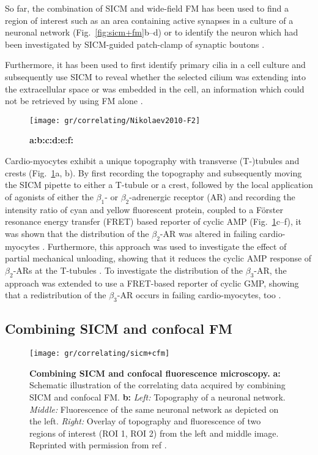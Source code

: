 So far, the combination of SICM and wide-field FM has been used to find a
region of interest such as an area containing active synapses in a culture of
a neuronal network \cite{Scheenen2015} (Fig.~\ref{fig:sicm+fm}b--d) or to
identify the neuron which had been investigated by SICM-guided patch-clamp of
synaptic boutons \cite{Novak2013}.

Furthermore, it has been used to first identify primary cilia in a cell
culture and subsequently use SICM to reveal whether the selected cilium was
extending into the extracellular space or was embedded in the cell, an
information which could not be retrieved by using FM alone \cite{Zhou2018}.


\begin{figure}
  \texttt{[image: gr/correlating/Nikolaev2010-F2]}
  \caption{
    \textbf{a:}\textbf{b:}\textbf{c:}\textbf{d:}\textbf{e:}\textbf{f:}
  }
  \label{fig:nikolaev2010}
\end{figure}

Cardio-myocytes exhibit a unique topography with transverse (T-)tubules and
crests (Fig.~\ref{fig:nikolaev2010}a, b). By first recording the topography
and subsequently moving the SICM pipette to either a T-tubule or a crest,
followed by the local application of agonists of either the $\beta_1$- or
$\beta_2$-adrenergic receptor (AR) and recording the intensity ratio of cyan
and yellow fluorescent protein, coupled to a Förster resonance energy transfer
(FRET) based reporter of cyclic AMP (Fig.~\ref{fig:nikolaev2010}c--f), it was
shown that the distribution of the $\beta_2$-AR was altered in failing
cardio-myocytes \cite{Nikolaev2010}. Furthermore, this approach was used to
investigate the effect of partial mechanical unloading, showing that it
reduces the cyclic AMP response of $\beta_2$-ARs at the T-tubules
\cite{Wright2018}. To investigate the distribution of the $\beta_3$-AR, the
approach was extended to use a FRET-based reporter of cyclic GMP, showing that
a redistribution of the $\beta_3$-AR occurs in failing cardio-myocytes, too
\cite{Schobesberger2020}.



\subsection{Combining SICM and confocal FM}

\begin{figure}
  \texttt{[image: gr/correlating/sicm+cfm]}
  \caption{%
    \textbf{Combining SICM and confocal fluorescence microscopy.}
    \textbf{a:} Schematic illustration of the correlating data acquired by combining SICM and confocal FM.
    \textbf{b:} 
    	\textit{Left:} Topography of a neuronal network.
    	\textit{Middle:} Fluorescence of the same neuronal network as depicted on the left.
    	\textit{Right:} Overlay of topography and fluorescence of two regions of interest (ROI 1, ROI 2) from
    	the left and middle image.
    Reprinted with permission from ref \cite{Novak2013}.
  }
  \label{fig:sicm+cfm}
\end{figure}

